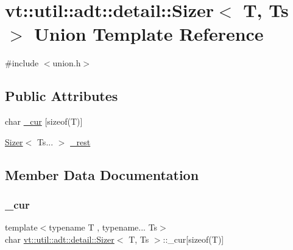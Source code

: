 \hypertarget{unionvt_1_1util_1_1adt_1_1detail_1_1_sizer}{}\section{vt\+:\+:util\+:\+:adt\+:\+:detail\+:\+:Sizer$<$ T, Ts $>$ Union Template Reference}
\label{unionvt_1_1util_1_1adt_1_1detail_1_1_sizer}


{\ttfamily \#include $<$union.\+h$>$}

\subsection*{Public Attributes}
\begin{DoxyCompactItemize}
\item 
char \hyperlink{unionvt_1_1util_1_1adt_1_1detail_1_1_sizer_ab659dbf40d7aefdf14f206a1df10a441}{\+\_\+cur} \mbox{[}sizeof(T)\mbox{]}
\item 
\hyperlink{unionvt_1_1util_1_1adt_1_1detail_1_1_sizer}{Sizer}$<$ Ts... $>$ \hyperlink{unionvt_1_1util_1_1adt_1_1detail_1_1_sizer_a7e30375672bcb283804e3589c96ffccf}{\+\_\+rest}
\end{DoxyCompactItemize}


\subsection{Member Data Documentation}
\mbox{\label{unionvt_1_1util_1_1adt_1_1detail_1_1_sizer_ab659dbf40d7aefdf14f206a1df10a441}} 
\subsubsection{\texorpdfstring{\+\_\+cur}{\_cur}}
{\footnotesize\ttfamily template$<$typename T , typename... Ts$>$ \\
char \hyperlink{unionvt_1_1util_1_1adt_1_1detail_1_1_sizer}{vt\+::util\+::adt\+::detail\+::\+Sizer}$<$ T, Ts $>$\+::\+\_\+cur\mbox{[}sizeof(T)\mbox{]}}

\mbox{\label{unionvt_1_1util_1_1adt_1_1detail_1_1_sizer_a7e30375672bcb283804e3589c96ffccf}} 
